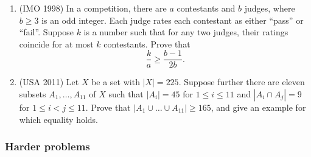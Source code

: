 \documentclass[11pt,paper=letter]{scrartcl}
\begin{document}
\begin{enumerate}
\item (IMO 1998) In a competition, there are $a$ contestants and $b$ judges, where $b \ge 3$ is an odd integer. Each judge rates each contestant as either ``pass'' or ``fail''. Suppose $k$ is a number such that for any two judges, their ratings coincide for at most $k$ contestants. Prove that \[
  \frac{k}{a} \ge \frac{b-1}{2b}.
\]

\item (USA 2011) Let $X$ be a set with $|X| = 225$. Suppose further there are eleven subsets $A_1, \ldots, A_{11}$ of $X$ such that $|A_i| = 45$ for $1 \le i \le 11$ and $|A_i \cap A_j| = 9$ for $1 \le i < j \le 11$. Prove that $|A_1 \cup \dots \cup A_{11}| \ge 165$, and give an example for which equality holds. \hint{\ref{h:2}}

\end{enumerate}

\subsubsection*{Harder problems}
\end{document}
